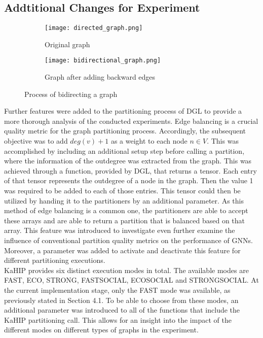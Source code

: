 \documentclass[acmsmall,nonacm,screen,review]{acmart}
\begin{document}
\subsection{Addtitional Changes for Experiment}
\begin{figure}[bt!]
     \centering
     \begin{subfigure}[b]{0.45\textwidth}
         \centering
         \texttt{[image: directed\_graph.png]}
         \caption{Original graph}
         \label{uni}
     \end{subfigure}
     \hfill
     \begin{subfigure}[b]{0.45\textwidth}
         \centering
         \texttt{[image: bidirectional\_graph.png]}
         \caption{Graph after adding backward edges}
         \label{bi}
     \end{subfigure}
     \caption{Process of bidirecting a graph}
     \label{bidirecting}
\end{figure}
Further features were added to the partitioning process of DGL to provide a more thorough analysis of the conducted experiments. Edge balancing is a crucial quality metric for the graph partitioning process. Accordingly, the subsequent objective was to add $deg(v) + 1$ as a weight to each node $n \in V$. This was accomplished by including an additional setup step before calling a partition, where the information of the outdegree was extracted from the graph. This was achieved through a function, provided by DGL, that returns a tensor. Each entry of that tensor represents the outdegree of a node in the graph. Then the value 1 was required to be added to each of those entries. This tensor could then be utilized by handing it to the partitioners by an additional parameter. As this method of edge balancing is a common one, the partitioners are able to accept these arrays and are able to return a partition that is balanced based on that array. This feature was introduced to investigate even further examine the influence of conventional partition quality metrics on the performance of GNNs. Moreover, a parameter was added to activate and deactivate this feature for different partitioning executions.  \\
KaHIP provides six distinct execution modes in total. The available modes are FAST, ECO, STRONG, FASTSOCIAL, ECOSOCIAL and STRONGSOCIAL.  At the current implementation stage, only the FAST mode was available, as previously stated in Section 4.1. To be able to choose from these modes, an additional parameter was introduced to all of the functions that include the KaHIP partitioning call. This allows for an insight into the impact of the different modes on different types of graphs in the experiment.
\end{document}
